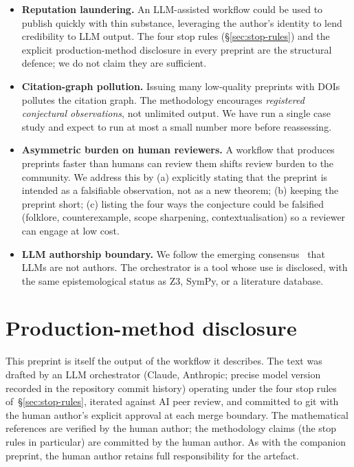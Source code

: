 \documentclass[11pt]{article}
\theoremstyle{definition}
\theoremstyle{remark}
\begin{document}
\begin{itemize}
\item \textbf{Reputation laundering.} An LLM-assisted workflow could be
used to publish quickly with thin substance, leveraging the author's
identity to lend credibility to LLM output. The four stop rules
(\S\ref{sec:stop-rules}) and the explicit production-method disclosure
in every preprint are the structural defence; we do not claim they are
sufficient.
\item \textbf{Citation-graph pollution.} Issuing many low-quality
preprints with DOIs pollutes the citation graph. The methodology
encourages \emph{registered conjectural observations}, not unlimited
output. We have run a single case study and expect to run at most a
small number more before reassessing.
\item \textbf{Asymmetric burden on human reviewers.} A workflow that
produces preprints faster than humans can review them shifts review
burden to the community. We address this by (a) explicitly stating
that the preprint is intended as a falsifiable observation, not as a
new theorem; (b) keeping the preprint short; (c) listing the four
ways the conjecture could be falsified (folklore, counterexample, scope
sharpening, contextualisation) so a reviewer can engage at low cost.
\item \textbf{LLM authorship boundary.} We follow the emerging
consensus~\cite{Nature2023LLMPolicy, ICMJE2023AIGuidance} that LLMs are
not authors. The orchestrator is a tool whose use is disclosed, with
the same epistemological status as Z3, SymPy, or a literature
database.
\end{itemize}

\section{Production-method disclosure}\label{sec:self-disclosure}

This preprint is itself the output of the workflow it describes. The
text was drafted by an LLM orchestrator (Claude, Anthropic; precise
model version recorded in the repository commit history) operating
under the four stop rules of~\S\ref{sec:stop-rules}, iterated against
AI peer review, and committed to git with the human author's explicit
approval at each merge boundary. The mathematical references are
verified by the human author; the methodology claims (the stop rules
in particular) are committed by the human author. As with the
companion preprint, the human author retains full responsibility for
the artefact.
\end{document}

